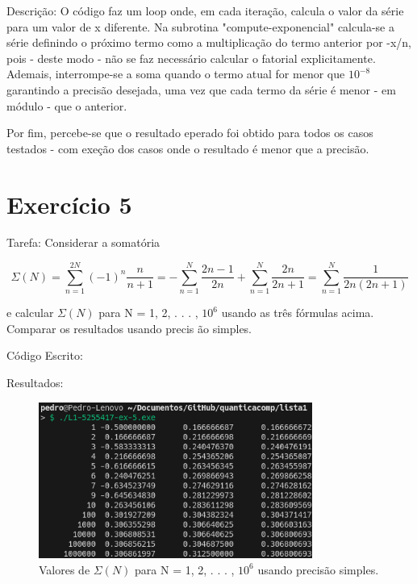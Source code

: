 \documentclass[12pt, a4paper]{article} %
\begin{document}
Descri\c{c}\~ao: O c\'odigo faz um loop onde, em cada itera\c{c}\~ao, calcula o valor da s\'erie para um valor de x diferente. Na subrotina "compute-exponencial" calcula-se a s\'erie definindo o pr\'oximo termo como a multiplica\c{c}\~ao do termo anterior por -x/n, pois - deste modo - n\~ao se faz necess\'ario calcular o fatorial explicitamente. Ademais, interrompe-se a soma quando o termo atual for menor que $10^{-8}$ garantindo a precis\~ao desejada, uma vez que cada termo da s\'erie \'e menor - em m\'odulo - que o anterior.

Por fim, percebe-se que o resultado eperado foi obtido para todos os casos testados - com exe\c{c}\~ao dos casos onde o resultado \'e menor que a precis\~ao.

\section{Exerc\'icio 5}

Tarefa: Considerar a somat\'oria

\begin{equation} \Sigma (N) = \sum_{n=1}^{2N} (-1)^n\frac{n}{n+1} = - \sum_{n=1}^N \frac{2n-1}{2n} + \sum_{n=1}^N \frac{2n}{2n+1} = \sum_{n=1}^N \frac{1}{2n(2n+1)} \end{equation}

e calcular $\Sigma (N)$ para N = 1, 2, . . . , $10^6$ usando as tr\^es f\'ormulas acima. Comparar os resultados usando precis \~ao simples.

C\'odigo Escrito:


Resultados:
\begin{figure}[H]
    \centering
    \includegraphics[width=0.8\textwidth]{../images/results-ex5.png}
    \caption{Valores de $\Sigma (N)$ para N = 1, 2, . . . , $10^6$ usando precis\~ao simples.}
\end{figure}
\end{document}
